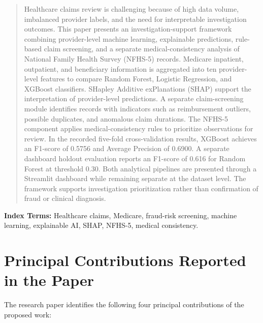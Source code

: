 \begin{quote}
Healthcare claims review is challenging because of high data volume, imbalanced provider labels, and the need for interpretable investigation outcomes. This paper presents an investigation-support framework combining provider-level machine learning, explainable predictions, rule-based claim screening, and a separate medical-consistency analysis of National Family Health Survey (NFHS-5) records. Medicare inpatient, outpatient, and beneficiary information is aggregated into ten provider-level features to compare Random Forest, Logistic Regression, and XGBoost classifiers. SHapley Additive exPlanations (SHAP) support the interpretation of provider-level predictions. A separate claim-screening module identifies records with indicators such as reimbursement outliers, possible duplicates, and anomalous claim durations. The NFHS-5 component applies medical-consistency rules to prioritize observations for review. In the recorded five-fold cross-validation results, XGBoost achieves an F1-score of 0.5756 and Average Precision of 0.6900. A separate dashboard holdout evaluation reports an F1-score of 0.616 for Random Forest at threshold 0.30. Both analytical pipelines are presented through a Streamlit dashboard while remaining separate at the dataset level. The framework supports investigation prioritization rather than confirmation of fraud or clinical diagnosis.
\end{quote}

\noindent\textbf{Index Terms:} Healthcare claims, Medicare, fraud-risk screening, machine learning, explainable AI, SHAP, NFHS-5, medical consistency.

\section{Principal Contributions Reported in the Paper}

The research paper identifies the following four principal contributions of the proposed work:

